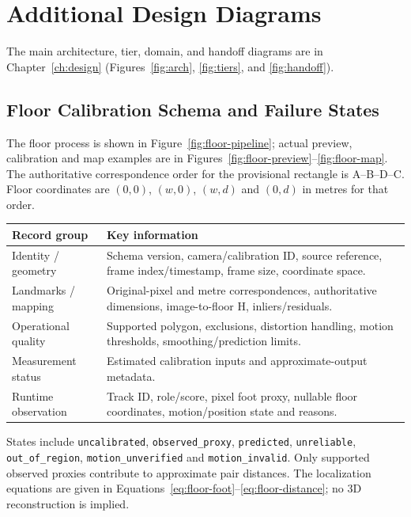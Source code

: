\chapter{Additional Design Diagrams}
The main architecture, tier, domain, and handoff diagrams are in Chapter~\ref{ch:design} (Figures~\ref{fig:arch}, \ref{fig:tiers}, and \ref{fig:handoff}). 

\section{Floor Calibration Schema and Failure States}
The floor process is shown in Figure~\ref{fig:floor-pipeline}; actual preview, calibration and map examples are in Figures~\ref{fig:floor-preview}--\ref{fig:floor-map}. The authoritative correspondence order for the provisional rectangle is A--B--D--C. Floor coordinates are $(0,0)$, $(w,0)$, $(w,d)$ and $(0,d)$ in metres for that order.

\begin{tabular}{P{0.28\textwidth}P{0.59\textwidth}}
\toprule
Record group & Key information\\
\midrule
Identity / geometry & Schema version, camera/calibration ID, source reference, frame index/timestamp, frame size, coordinate space.\\
Landmarks / mapping & Original-pixel and metre correspondences, authoritative dimensions, image-to-floor H, inliers/residuals.\\
Operational quality & Supported polygon, exclusions, distortion handling, motion thresholds, smoothing/prediction limits.\\
Measurement status & Estimated calibration inputs and approximate-output metadata.\\
Runtime observation & Track ID, role/score, pixel foot proxy, nullable floor coordinates, motion/position state and reasons.\\
\bottomrule
\end{tabular}

States include \texttt{uncalibrated}, \texttt{observed\_proxy}, \texttt{predicted}, \texttt{unreliable}, \texttt{out\_of\_region}, \texttt{motion\_unverified} and \texttt{motion\_invalid}. Only supported observed proxies contribute to approximate pair distances. The localization equations are given in Equations~\ref{eq:floor-foot}--\ref{eq:floor-distance}; no 3D reconstruction is implied.
